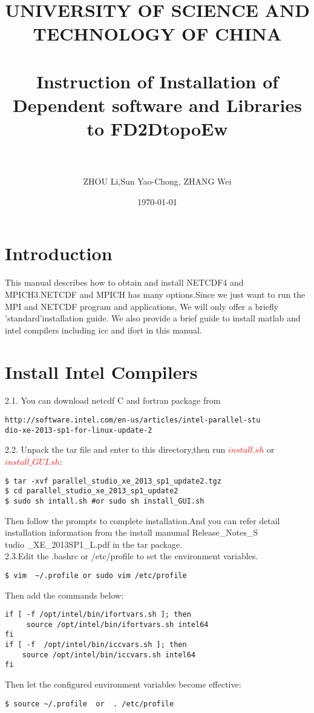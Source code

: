 \documentclass[paper=a4, fontsize=11pt]{scrartcl}
\title{
        \normalfont \normalsize
        {UNIVERSITY OF SCIENCE AND TECHNOLOGY OF CHINA} \\ [25pt]
        \horrule{0.8pt} \\[0.4cm]
        \LARGE {Instruction of Installation of Dependent software and Libraries to FD2DtopoEw} \\
        \horrule{2pt} \\[0.5cm]
       }
\author{ZHOU Li,Sun Yao-Chong, ZHANG Wei}
\date  {\normalsize\today}
\numberwithin{equation}{section}
\numberwithin{figure}{section}
\numberwithin{table}{section}
\begin{document}
\maketitle
\newpage
\tableofcontents
\newpage
\LARGE{\section{Introduction}}
\normalsize{
This manual describes how to obtain and install NETCDF4 and MPICH3.NETCDF and MPICH has many options.Since we just
want to run the MPI and NETCDF program and applications, We will only offer a briefly 'standard'installation guide.
We also provide a brief guide to install matlab and intel compilers including icc and ifort in  this manual.  }
\\
\LARGE{\section{Install Intel Compilers }}
\Large{2.1}. You can download netcdf C and fortran package from 
{\color{Brown}\begin{verbatim}
http://software.intel.com/en-us/articles/intel-parallel-stu
dio-xe-2013-sp1-for-linux-update-2
\end{verbatim}}
\Large{2.2}. Unpack the tar file and enter to this directory,then run \textcolor{red}{$install.sh$} or \textcolor{red}{$install\_GUI.sh$}:
{\color{blue}\begin{verbatim}
$ tar -xvf parallel_studio_xe_2013_sp1_update2.tgz 
$ cd parallel_studio_xe_2013_sp1_update2
$ sudo sh intall.sh #or sudo sh install_GUI.sh
\end{verbatim}}
Then follow the prompts to complete installation.And you can refer detail installation information from the install
manumal Release\_Notes\_S  \\
tudio \_XE\_2013SP1\_L.pdf in the tar package.
\\
\Large{2.3}.Edit the .bashrc or /etc/profile to set the environment variables.
{\color{Brown}\begin{verbatim}
$ vim  ~/.profile or sudo vim /etc/profile
\end{verbatim}}
Then add the commands below:
{\color{blue}\begin{verbatim}
if [ -f /opt/intel/bin/ifortvars.sh ]; then
     source /opt/intel/bin/ifortvars.sh intel64
fi
if [ -f  /opt/intel/bin/iccvars.sh ]; then
    source /opt/intel/bin/iccvars.sh intel64
fi
\end{verbatim}}
Then let the configured environment variables become effective:
{\color{blue}\begin{verbatim}
$ source ~/.profile  or  . /etc/profile
\end{verbatim}}
\end{document}
